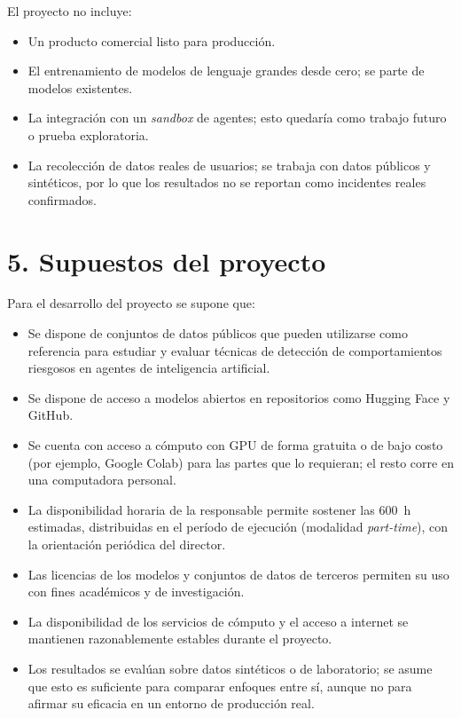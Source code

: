 \documentclass[
11pt, %
]{charter}
\begin{document}
El proyecto no incluye:
\begin{itemize}
	\item Un producto comercial listo para producción.
	\item El entrenamiento de modelos de lenguaje grandes desde cero; se parte de modelos existentes.
	\item La integración con un \textit{sandbox} de agentes; esto quedaría como trabajo futuro o prueba exploratoria.
	\item La recolección de datos reales de usuarios; se trabaja con datos públicos y sintéticos, por lo que los resultados no se reportan como incidentes reales confirmados.
\end{itemize}


\section{5. Supuestos del proyecto}
\label{sec:supuestos}

Para el desarrollo del proyecto se supone que:
\begin{itemize}
	\item Se dispone de conjuntos de datos públicos que pueden utilizarse como referencia para estudiar y evaluar técnicas de detección de comportamientos riesgosos en agentes de inteligencia artificial.
	\item Se dispone de acceso a modelos abiertos en repositorios como Hugging Face y GitHub.
	\item Se cuenta con acceso a cómputo con GPU de forma gratuita o de bajo costo (por ejemplo, Google Colab) para las partes que lo requieran; el resto corre en una computadora personal.
	\item La disponibilidad horaria de la responsable permite sostener las 600~h estimadas, distribuidas en el período de ejecución (modalidad \textit{part-time}), con la orientación periódica del director.
	\item Las licencias de los modelos y conjuntos de datos de terceros permiten su uso con fines académicos y de investigación.
	\item La disponibilidad de los servicios de cómputo y el acceso a internet se mantienen razonablemente estables durante el proyecto.
	\item Los resultados se evalúan sobre datos sintéticos o de laboratorio; se asume que esto es suficiente para comparar enfoques entre sí, aunque no para afirmar su eficacia en un entorno de producción real.
\end{itemize}
\end{document}
